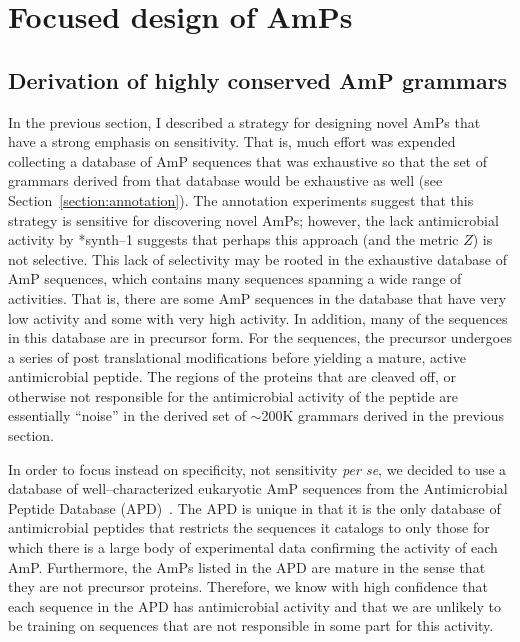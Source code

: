 \section{Focused design of AmPs}\label{section:focused}

\subsection{Derivation of highly conserved AmP grammars}

    In the previous section, I described a strategy for designing
    novel AmPs that have a strong emphasis on sensitivity.  That is,
    much effort was expended collecting a database of AmP sequences
    that was exhaustive so that the set of grammars derived from
    that database would be exhaustive as well
    (see Section~\vref{section:annotation}).  The
    annotation experiments suggest that this strategy is sensitive
    for discovering novel AmPs; however, the lack
    antimicrobial activity by *synth--1 suggests that perhaps this
    approach (and the metric $Z$) is not selective.  This lack of selectivity may be
    rooted in the exhaustive database of AmP sequences, which
    contains many sequences spanning a wide range of
    activities.  That is, there are some AmP sequences in the
    database that have very low activity and some with very high
    activity.  In addition, many of the sequences in this database
    are in precursor form.  For the sequences, the precursor
    undergoes a series of post translational modifications before
    yielding a mature, active antimicrobial peptide.  The regions of
    the proteins that are cleaved off, or otherwise not responsible
    for the antimicrobial activity of the peptide are essentially
    ``noise'' in the derived set of $\sim$200K grammars derived in
    the previous section.

    In order to focus instead on specificity, not sensitivity \emph{per se}, we
    decided to use a database of well--characterized eukaryotic AmP
    sequences from the Antimicrobial Peptide Database
    (APD)~\cite{wang2004apd}.  The APD is unique in that it is the
    only database of antimicrobial peptides that restricts the
    sequences it catalogs to only those for which there is a large
    body of experimental data confirming the activity of each AmP.
    Furthermore, the AmPs listed in the APD are mature in the sense
    that they are not precursor proteins.  Therefore, we know with
    high confidence that each sequence in the APD  has
    antimicrobial activity and that we are unlikely to be training
    on sequences that are not responsible in some part for this activity.

